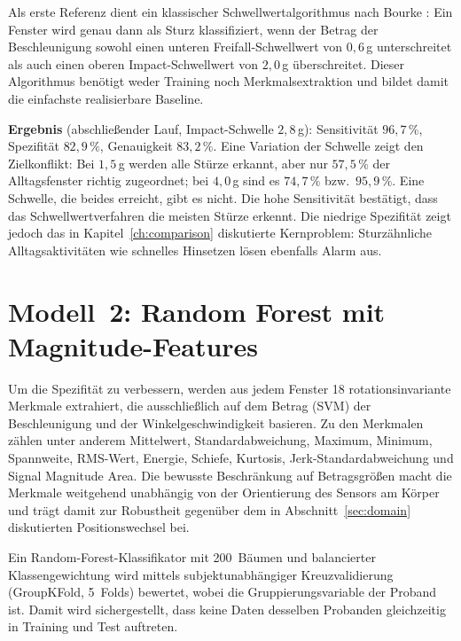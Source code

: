\documentclass[11pt,a4paper,oneside]{report}
\begin{document}
Als erste Referenz dient ein klassischer Schwellwertalgorithmus nach
Bourke \cite{bagala2012}: Ein Fenster wird genau dann als Sturz
klassifiziert, wenn der Betrag der Beschleunigung sowohl einen unteren
Freifall-Schwellwert von $0{,}6$\,g unterschreitet als auch einen
oberen Impact-Schwellwert von $2{,}0$\,g überschreitet. Dieser
Algorithmus benötigt weder Training noch Merkmalsextraktion und bildet
damit die einfachste realisierbare Baseline.

\textbf{Ergebnis} (abschließender Lauf, Impact-Schwelle $2{,}8$\,g):
Sensitivität $96{,}7\,\%$, Spezifität $82{,}9\,\%$, Genauigkeit
$83{,}2\,\%$. Eine Variation der Schwelle zeigt den Zielkonflikt: Bei
$1{,}5$\,g werden alle Stürze erkannt, aber nur $57{,}5\,\%$ der
Alltagsfenster richtig zugeordnet; bei $4{,}0$\,g sind es $74{,}7\,\%$
bzw.\ $95{,}9\,\%$. Eine Schwelle, die beides erreicht, gibt es nicht.
Die hohe Sensitivität bestätigt, dass das
Schwellwertverfahren die meisten Stürze erkennt. Die niedrige
Spezifität zeigt jedoch das in Kapitel~\ref{ch:comparison} diskutierte
Kernproblem: Sturzähnliche Alltagsaktivitäten wie schnelles Hinsetzen
lösen ebenfalls Alarm aus.

\section{Modell~2: Random Forest mit Magnitude-Features}
\label{sec:randomforest}

Um die Spezifität zu verbessern, werden aus jedem Fenster 18
rotationsinvariante Merkmale extrahiert, die ausschließlich auf dem
Betrag (\ac{SVM}) der Beschleunigung und der Winkelgeschwindigkeit
basieren. Zu den Merkmalen zählen unter anderem Mittelwert,
Standardabweichung, Maximum, Minimum, Spannweite, RMS-Wert, Energie,
Schiefe, Kurtosis, Jerk-Standardabweichung und Signal Magnitude Area.
Die bewusste Beschränkung auf Betragsgrößen macht die Merkmale
weitgehend unabhängig von der Orientierung des Sensors am Körper und
trägt damit zur Robustheit gegenüber dem in Abschnitt~\ref{sec:domain}
diskutierten Positionswechsel bei.

Ein Random-Forest-Klassifikator mit 200~Bäumen und balancierter
Klassengewichtung wird mittels subjektunabhängiger
Kreuzvalidierung (GroupKFold, 5~Folds) bewertet, wobei die
Gruppierungsvariable der Proband ist. Damit wird sichergestellt, dass
keine Daten desselben Probanden gleichzeitig in Training und Test
auftreten.
\end{document}
